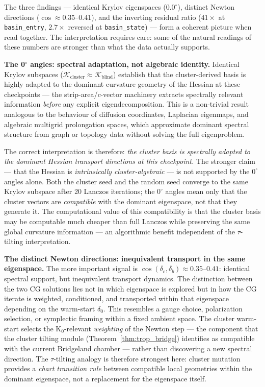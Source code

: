 \documentclass[11pt]{amsart}
\begin{document}
The three findings --- identical Krylov eigenspaces ($0.0^\circ$),
distinct Newton directions ($\cos \approx 0.35$--$0.41$),
and the inverting residual ratio ($41\times$ at
\texttt{basin\_entry}, $2.7\times$ reversed at \texttt{basin\_state})
--- form a coherent picture when read together.
The interpretation requires care: some of the natural readings of these
numbers are stronger than what the data actually supports.

\textbf{The 0$^\circ$ angles: spectral adaptation, not algebraic identity.}
Identical Krylov subspaces ($\mathcal{K}_\mathrm{cluster}
\approx \mathcal{K}_\mathrm{blind}$) establish that the cluster-derived
basis is highly adapted to the dominant curvature geometry of the
Hessian at these checkpoints --- the strip-area/$c$-vector machinery
extracts spectrally relevant information \emph{before} any explicit
eigendecomposition.
This is a non-trivial result analogous to the behaviour of diffusion
coordinates, Laplacian eigenmaps, and algebraic multigrid prolongation
spaces, which approximate dominant spectral structure from graph or
topology data without solving the full eigenproblem.

The correct interpretation is therefore:
\emph{the cluster basis is spectrally adapted to the dominant Hessian
transport directions at this checkpoint.}
The stronger claim --- that the Hessian is \emph{intrinsically
cluster-algebraic} --- is not supported by the $0^\circ$ angles alone.
Both the cluster seed and the random seed converge to the same Krylov
subspace after 20 Lanczos iterations; the $0^\circ$ angles mean only
that the cluster vectors are \emph{compatible} with the dominant
eigenspace, not that they generate it.
The computational value of this compatibility is that the cluster basis
may be computable much cheaper than full Lanczos while preserving the
same global curvature information --- an algorithmic benefit independent
of the $\tau$-tilting interpretation.

\textbf{The distinct Newton directions: inequivalent transport in the same eigenspace.}
The more important signal is $\cos(\delta_c, \delta_b) \approx 0.35$--$0.41$:
identical spectral support, but inequivalent transport dynamics.
The distinction between the two CG solutions lies not in which
eigenspace is explored but in how the CG iterate is weighted,
conditioned, and transported within that eigenspace depending on
the warm-start $\delta_0$.
This resembles a gauge choice, polarization selection, or symplectic
framing within a fixed ambient space.
The cluster warm-start selects the K$_0$-relevant
\emph{weighting} of the Newton step --- the component that the
cluster tilting module (Theorem~\ref{thm:trop_bridge}) identifies as
compatible with the current Bridgeland chamber --- rather than
discovering a new spectral direction.
The $\tau$-tilting analogy is therefore strongest here:
cluster mutation provides a \emph{chart transition rule} between
compatible local geometries within the dominant eigenspace,
not a replacement for the eigenspace itself.
\end{document}
